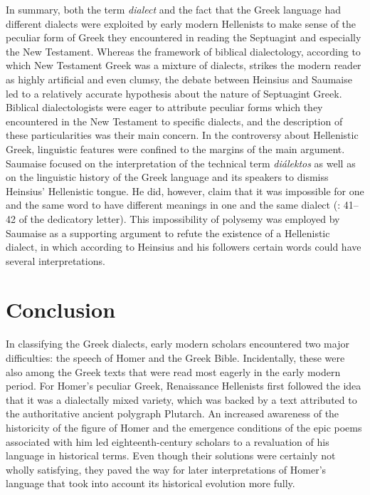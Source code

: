 In summary, both the term \textit{dialect} and the fact that the Greek language had different dialects were exploited by early modern Hellenists to make sense of the peculiar form of Greek they encountered in reading the Septuagint and especially the New Testament. Whereas the framework of biblical dialectology, according to which New Testament Greek was a mixture of dialects, strikes the modern reader as highly artificial and even clumsy, the debate between Heinsius and Saumaise led to a relatively accurate hypothesis about the nature of Septuagint Greek. Biblical dialectologists were eager to attribute peculiar forms which they encountered in the New Testament to specific dialects, and the description of these particularities was their main concern. In the controversy about Hellenistic Greek, linguistic features were confined to the margins of the main argument. Saumaise focused on the interpretation of the technical term \textit{diálektos} as well as on the linguistic history of the Greek language and its speakers to dismiss Heinsius’ Hellenistic tongue. He did, however, claim that it was impossible for one and the same word to have different meanings in one and the same dialect (\citealt{Saumaise1643a}: 41–42 of the dedicatory letter). This impossibility of polysemy was employed by Saumaise as a supporting argument to refute the existence of a Hellenistic dialect, in which according to Heinsius and his followers certain words could have several interpretations.

\section{Conclusion}

In classifying the Greek dialects, early modern scholars encountered two major difficulties: the speech of Homer and the Greek Bible. Incidentally, these were also among the Greek texts that were read most eagerly in the early modern period. For Homer’s peculiar Greek, Renaissance Hellenists first followed the idea that it was a dialectally mixed variety, which was backed by a text attributed to the authoritative ancient polygraph Plutarch. An increased awareness of the historicity of the figure of Homer and the emergence conditions of the epic poems associated with him led eighteenth-century scholars to a revaluation of his language in historical terms. Even though their solutions were certainly not wholly satisfying, they paved the way for later interpretations of Homer’s language that took into account its historical evolution more fully.


